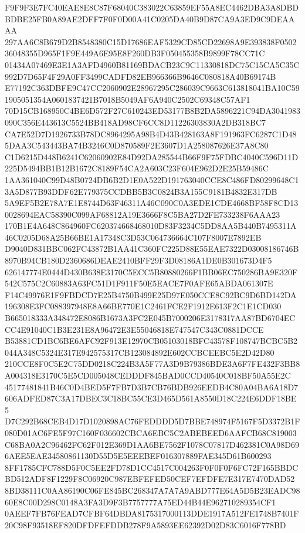\documentclass[UTF8,fontset=fandol,zihao=-4,a4paper]{ctexart}
\begin{document}
{{F9F9F3E7FC40EAE8E8C87F68040C383022C63859EF55A8EC4462DBA3A8DBDBDBE25FB0A89AE2DFF7F0F0D00A41C0205DA40B9D87CA9A3ED9C9DEAAAA
297AA6C8B679D2B8548380C15D17686EAF5329CD85CD22698A9E393838F050236048355D965F1F9E449A6E95E8F260DB3F050455358B9899F78CC71C
01434A07469E3E1A3AFD4960B81169BDACB23C9C11330818DC75C15CA5C35C992D7D65F4F29A0FF3499CADFD82EB966366B9646C080818A40B69174B
E77192C363DBFE9C47CC2060902E28967295C286039C9663C613818041BA10C591905051354A0601837421B7018B5049AF6A940C2502C69348C57AF1
70D15CB168950C4BE6D572F27C610243ED53177B8B2DA5896221C94DA3041983090C356E443613C5524BB418AD98CF6CC8D11226303830A2DB318BC7
CA7E52D7D1926733B78DC8964295A98B4D43B428163A8F191963FC6287C1D485DAA3C543443BA74B3246C0D870589F2E3607D1A258087626E37A8C80
C1D6215D448B6241C62060902E84D92DA285544B66F9F75FDBC4040C596D11D225D5494BB1B12B1672C8189F54CA2A603C23F604E962D2E25B59486C
1AA361040C99D48B0724DB6B2D1E0A522D191763040CCE8C486FD80299648C13A5D877B93DDF62E779375CCDBB5B3C0824B3A155C9181B4832E317DB
5A9EF5B2E78A7E1E8744D63F46311A46C090C0A3EDE1CDE4668BF58F8CD130028694EAC58390C099AF68812A19E3666F8C5BA27D2FE733238F6AAA23
170B1E4A648C864960FC620374668468010D83F3234C5DD8AA5B440B7495311A46C0205D68A25B66BE1A17348C3D53C064736664C107F8007E7892EB
D9040D831BBC062FC43872B1AA41C360FC225D88E55EAE7322D03008186746B8970B94CB180D2360686DEAE2410BFF29F3D08186A1DE0B301673D4F5
626147774E0444D430B638E3170C5ECC5B80880266F1BB06EC750286BA9E320F542C575C2C60883A63FC51D1F911F50E5EACE7F0AFE65ABDA061307E
F14C49976E1F9FBDCD7E25B4750B499E25D97E050CCE8C92BC9D6BD142DA196308E3FC088397948E8A66BE770E1C2461FCE2F1912E613F2C1E1CD030
B665018333A348472E8086B1673A3FC2E045B7000206E3178317AA87BD6704ECCC4E91040C1B3E231E8A96472E3E55046818E747547C343C0881DCCE
B53881CD1BC6BE6AFC92F913E12970CB05103018BFC43578F108747BCBC5B2044A348C5324E317E942575317CB123084892E602CCBCEEBC5E2D42D80
210CCE8F0C5E2C75DD0218C224B3A5F77A3D9B79386BDE3A6F7FE432F3BB8A004318E3170C5E5CD005048CEDDDF845BAD0CCD40540C018BF50A55E2C
45177481841B46C0D4BED5F7FB7D3B7CB76BDB926EEDB4C80A04BA6A18D7606ADFED87C3A17DBEC3C18BC55CE3D465D561A8550D18C224E6DDF18BE5
D7C292B68CEB4D17D1020898AC76FEDDDD5D7BBE748974F5167F5D3372B1F080D01AC6FE5F97C160F036602CBCA6EBC5C2ABEBEED6AAFCB68C819003
C68BA0A2C96462FC62F012E369D1AA6BE7562F1078C07817D462381C0A98D696AEE5EAE34580861130D55D5E5EEEBEF016307889FAE345D61B600293
8FF1785CFC788D5F0C5EE2FD78D1CC4517C004263F0F0F0F6FC72F165BBDCBD512ADF8F1229F8C06920C987EBFEFED50CEF7EFDFE7E317E7470DAD52
8BD38111C0AA86190C06FE845BC268347A7A7A9ABD777E64A5D5B23EADC9860E8C00D298C0148A3FA3D9F3B7757777A75ED44B44E962710289354CF1
0AEEF7FB76FEAD7CFBF64DBDA8175317000113DDE1917A512FE1748B7401F20C98F93518EF820DFDFEFDDB278F9A5893EE62392D02D83C6016F778BD
}}
\end{document}
